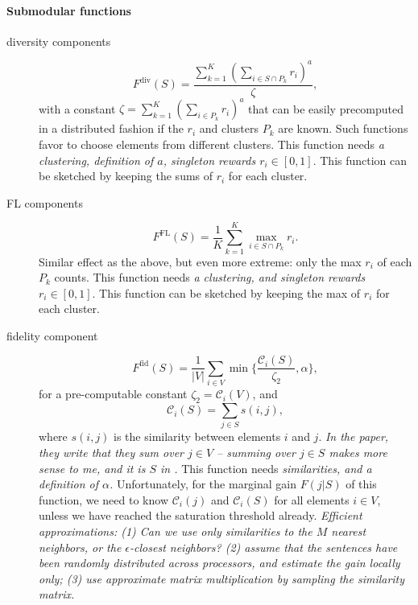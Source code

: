 \documentclass{article}
\newcommand{\inter}{\cap}
\begin{document}
\paragraph{Submodular functions}
\begin{description}
\item[diversity components]
  \begin{equation}
    \label{eq:6}
    F^{\text{div}}(S) = \frac{\sum_{k=1}^K(\sum_{i \in S \inter P_k}r_i)^a}{\zeta},
  \end{equation}
  with a constant $\zeta = \sum_{k=1}^K(\sum_{i \in P_k}r_i)^a$ that can be easily precomputed in a distributed fashion if the $r_i$ and clusters $P_k$ are known. Such functions favor to choose elements from different clusters.
  This function needs \emph{a clustering, definition of $a$, singleton rewards $r_i \in [0,1]$}. This function can be sketched by keeping the sums of $r_i$ for each cluster.
\item[FL components]
  \begin{equation}
    \label{eq:7}
    F^{\text{FL}}(S) = \frac{1}{K}\sum_{k=1}^K \max_{i \in S \inter P_k} r_i.
  \end{equation}
  Similar effect as the above, but even more extreme: only the max $r_i$ of each $P_k$ counts.
  This function needs \emph{a clustering, and  singleton rewards $r_i \in [0,1]$}.
  This function can be sketched by keeping the max of $r_i$ for each cluster.
\item[fidelity component]
  \begin{equation}
    \label{eq:8}
    F^{\text{fid}}(S) = \frac{1}{|V|} \sum_{i \in V} \min\{ \frac{\mathcal{C}_i(S)}{\zeta_2}, \alpha \},
  \end{equation}
  for a pre-computable constant $\zeta_2 = \mathcal{C}_i(V)$, and
  \begin{equation}
    \label{eq:5}
    \mathcal{C}_i(S) = \sum_{j \in S} s(i,j),
  \end{equation}
  where $s(i,j)$ is the similarity between elements $i$ and $j$. \emph{In the paper, they write that they sum over $j \in V$ -- summing over $j \in S$ makes more sense to me, and it is $S$ in \citep{linB11}.} This function needs \emph{similarities, and a definition of $\alpha$.}
  Unfortunately, for the marginal gain $F(j | S)$ of this function, we need to know $\mathcal{C}_i(j)$ and $\mathcal{C}_i(S)$ for all elements $i \in V$, unless we have reached the saturation threshold already. \emph{Efficient approximations: (1) Can we use only similarities to the $M$ nearest neighbors, or the $\epsilon$-closest neighbors? (2) assume that the sentences have been randomly distributed across processors, and estimate the gain locally only; (3) use approximate matrix multiplication by sampling the similarity matrix.}
\end{description}
\end{document}
